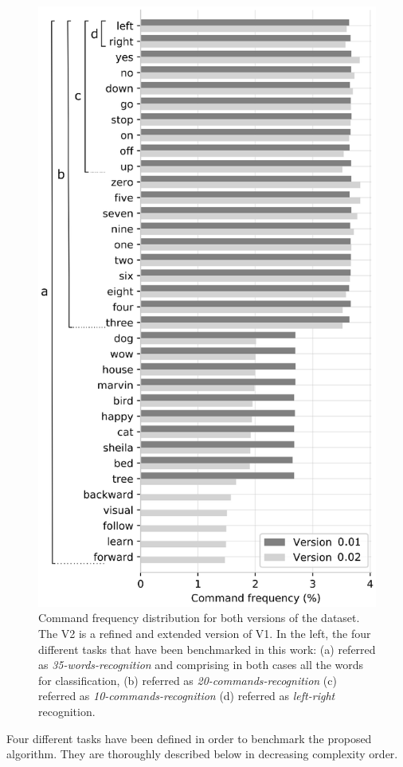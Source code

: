 \begin{figure}[ht]
	\centering
	\includegraphics[width=0.45\linewidth]{kws/images/freqdist_data}
	\caption[Speech commands frequency distribution]{Command frequency distribution for both versions of the dataset. The V2 is a refined and extended version of V1. In the left, the four different tasks that have been benchmarked in this work: (a) referred as \textit{35-words-recognition} and comprising in both cases all the words for classification, (b) referred as \textit{20-commands-recognition}  (c) referred as \textit{10-commands-recognition} (d) referred as \textit{left-right} recognition.}
	\label{fig:freqdistdata}
\end{figure}

Four different tasks have been defined in order to benchmark the proposed algorithm. They are thoroughly described below in decreasing complexity order.

